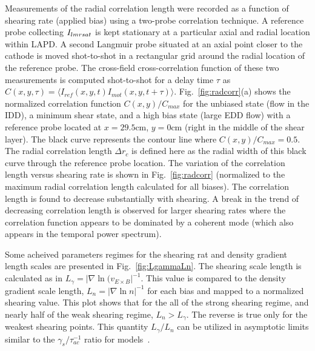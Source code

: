 \documentclass[aip,pop,amsmath,amssymb,reprint,superscriptaddress]{revtex4-1} %
\begin{document}
Measurements of the radial correlation length were recorded as a function of shearing rate (applied bias) using a two-probe correlation technique. A reference probe collecting $I_{\rmdefault sat}$ is kept stationary at a particular axial and radial location within LAPD. A second Langmuir probe situated at an axial point closer to the cathode is moved shot-to-shot in a rectangular grid around the radial location of the reference probe.  The cross-field cross-correlation function of these two measurements is computed shot-to-shot for a delay time $\tau$ as $C(x,y,\tau) = \langle I_{ref}(x,y,t)I_{mot}(x,y,t+\tau)\rangle$.
%
%
%
Fig.~\ref{fig:radcorr}(a) shows the normalized correlation function $C(x,y)/C_{max}$ for the unbiased state (flow in the IDD), a minimum shear state, and a high bias state (large EDD flow) with a reference probe located at $x=29.5$cm, $y=0$cm (right in the middle of the shear layer). The black curve represents the contour line where $C(x,y)/C_{max} = 0.5$. The radial correlation length $\Delta r_{c}$ is defined here as the radial width of this black curve through the reference probe location.   The variation of the correlation length versus shearing rate is shown in Fig.~\ref{fig:radcorr} (normalized to the maximum radial correlation length calculated for all biases).
The correlation length is found to decrease substantially with shearing.  A break in the trend of decreasing correlation length is observed for larger shearing rates where the correlation function appears to be dominated by a coherent mode (which also appears in the temporal power spectrum).

Some acheived parameters regimes for the shearing rat and density gradient length scales are presented in Fig.~\ref{fig:LgammaLn}. The shearing scale length is calculated as in $L_{\gamma} = |\nabla \ln(v_{E\times B}|^{-1}.$ This value is compared to the density gradient scale length, $L_{n} = |\nabla \ln{n}|^{-1}$ for each bias and mapped to a normalized shearing value. This plot shows that for the all of the strong shearing regime, and nearly half of the weak shearing regime, $L_{n} > L_{\gamma}$. The reverse is true only for the weakest shearing points. This quantity $L_{\gamma}/L_{n}$ can be utilized in asymptotic limits similar to the $\gamma_{s}/\tau_{ac}^{-1}$ ratio for models~\cite{leconte06}.
\end{document}
